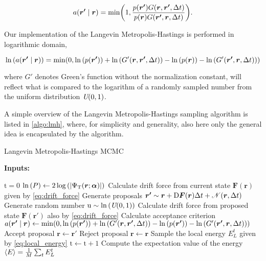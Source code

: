 \begin{equation}
    a\qty(\bm{r'}\mid\bm{r}) = \mathrm{min}\qty(1, \frac{p\qty({\bm{r'}})G\qty(\bm{r}, \bm{r'}, \Delta t)}{p\qty({\bm{r}})G\qty(\bm{r'}, \bm{r}, \Delta t)}).
\end{equation}

Our implementation of the Langevin Metropolis-Hastings is performed in logarithmic domain,  

\begin{equation}
    \ln{\qty(a\qty(\bm{r'}\mid\bm{r}))} = \mathrm{min}\qty(0, \ln{\qty(p\qty(\bm{r'}))} + \ln{\qty(G'\qty(\bm{r}, \bm{r'}, \Delta t))} - \ln{\qty(p\qty(\bm{r}))}-\ln{\qty(G'\qty(\bm{r'}, \bm{r}, \Delta t))})
\end{equation}

where $G'$ denotes Green's function without the normalization constant, will reflect what is compared to the logarithm of a randomly sampled number from the uniform distribution $\textit{U}\qty(0, 1)$. 

A simple overview of the Langevin Metropolis-Hastings sampling algorithm is listed in \autoref{algo:lmh}, where, for simplicity and generality, also here only the general idea is encapsulated by the algorithm. 

\begin{algorithm}
\caption{Langevin Metropolis-Hastings MCMC}\label{algo:lmh}
\hspace*{\algorithmicindent} \textbf{Inputs: }
\begin{algorithmic}[1]
\State $\mathrm{t}=0$
\State $\ln{\qty(P)}\gets 2\log{\qty(\abs{\Psi_{\mathrm{T}}(\bm{r};\bm{\alpha})})}$ 
\Repeat 
    \State Calculate drift force from current state $\bm{F}(\bm{r})$ given by \autoref{eq:drift_force}
    \State Generate proposals $\bm{r'}\sim\bm{r}+\mathrm{D}\bm{F}(\bm{r})\Delta t + \mathcal{N}\qty(\bm{r},\Delta t)$
    \State Generate random number $\mathrm{u}\sim\ln{\qty(\textit{U}(0, 1))}$
    \State Calculate drift force from proposed state $\bm{F}(\bm{r'})$ also by \autoref{eq:drift_force}
    \State Calculate acceptance criterion
    \State $a\qty(\bm{r'}\mid\bm{r})\gets\mathrm{min}\qty(0, \ln{\qty(p\qty(\bm{r'}))} + \ln{\qty(G'\qty(\bm{r}, \bm{r'}, \Delta t))} - \ln{\qty(p\qty(\bm{r'}))}-\ln{\qty(G'\qty(\bm{r'}, \bm{r}, \Delta t))})$
        \State Accept proposal $\bm{r}\gets\bm{r'}$
    \Else
        \State Reject proposal $\bm{r}\gets\bm{r}$
    \EndIf
    \State Sample the local energy $E^t_L$ given by \autoref{eq:local_energy}
    \State $\mathrm{t}\gets\mathrm{t}+1$
\State Compute the expectation value of the energy $\expval{E}=\frac{1}{M}\sum_t E^t_L$
\end{algorithmic}
\end{algorithm}

